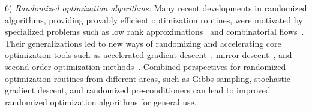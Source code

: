 \documentclass[12pt]{article}
\begin{document}
6) {\it Randomized optimization algorithms:}
Many recent developments in randomized algorithms, providing provably efficient optimization routines, were motivated by
specialized problems such as low rank approximations~\cite{Woodruff14,KannanVW14}
and combinatorial flows~\cite{Teng10,Madry13,KoutisMP10:journal}.
Their generalizations led to new ways of randomizing and accelerating
core optimization tools such as accelerated gradient descent~\cite{LeeS13},
mirror descent~\cite{AllenzhuO15},
and second-order optimization methods~\cite{LeeS14}.
Combined perspectives for randomized
optimization routines from different areas,
such as Gibbs sampling, stochastic gradient descent, and randomized pre-conditioners
 can lead to improved randomized optimization algorithms for general use.

\medskip

\end{document}
